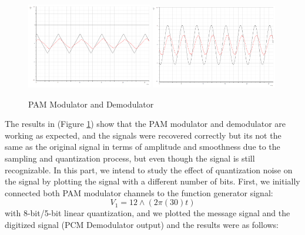 \documentclass[12pt]{article}
\begin{document}
\begin{figure}[H]
    \centering
    \includegraphics[width=0.49\textwidth]{assets//main/2023-08-26-22-19-56.png}
    \includegraphics[width=0.49\textwidth]{assets/main/2023-08-26-22-20-30.png}
    \caption{PAM Modulator and Demodulator}
    \label{fig:2}
\end{figure}
The results in (Figure \ref{fig:2}) show that the PAM modulator and demodulator are working as expected, and the signals were recovered correctly but its not the same as the original signal in terms of amplitude and smoothness due to the sampling and quantization process, but even though the signal is still recognizable.
In this part, we intend to study the effect of quantization noise on the signal by plotting the signal with a different number of bits. 
First, we initially connected both PAM modulator channels to the function generator signal:
\begin{equation}
    V_{1} = 12 \wedge(2\pi (30) t)
\end{equation}
with 8-bit/5-bit linear quantization, and we plotted the message signal and the digitized signal (PCM Demodulator output) and the results were as follows:
\end{document}
